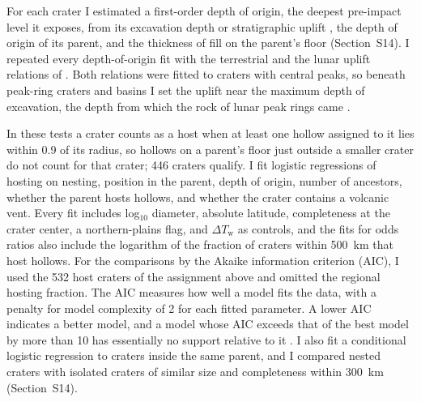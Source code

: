 \documentclass[article,review]{planetary}
\begin{document}
For each crater I estimated a first-order depth of origin, the deepest pre-impact level it exposes, from its excavation depth or stratigraphic uplift \parencite{croft1985,melosh1989,cintala1998}, the depth of origin of its parent, and the thickness of fill on the parent's floor (Section~S14). I repeated every depth-of-origin fit with the terrestrial and the lunar uplift relations of \textcite{cintala1998}. Both relations were fitted to craters with central peaks, so beneath peak-ring craters and basins I set the uplift near the maximum depth of excavation, the depth from which the rock of lunar peak rings came \parencite{baker2015,kring2016}.

In these tests a crater counts as a host when at least one hollow assigned to it lies within 0.9 of its radius, so hollows on a parent's floor just outside a smaller crater do not count for that crater; 446 craters qualify. I fit logistic regressions of hosting on nesting, position in the parent, depth of origin, number of ancestors, whether the parent hosts hollows, and whether the crater contains a volcanic vent. Every fit includes log$_{10}$ diameter, absolute latitude, completeness at the crater center, a northern-plains flag, and $\Delta T_\mathrm{w}$ as controls, and the fits for odds ratios also include the logarithm of the fraction of craters within 500~km that host hollows. For the comparisons by the Akaike information criterion (AIC), I used the 532 host craters of the assignment above and omitted the regional hosting fraction. The AIC measures how well a model fits the data, with a penalty for model complexity of 2 for each fitted parameter. A lower AIC indicates a better model, and a model whose AIC exceeds that of the best model by more than 10 has essentially no support relative to it \parencite{burnham2004}. I also fit a conditional logistic regression to craters inside the same parent, and I compared nested craters with isolated craters of similar size and completeness within 300~km (Section~S14).
\end{document}

